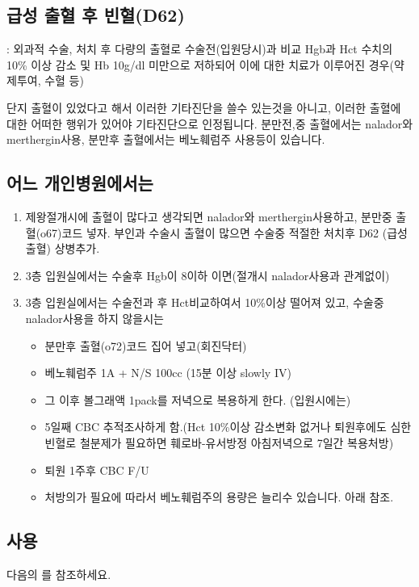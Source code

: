 \subsection*{급성 출혈 후 빈혈(D62)} : 외과적 수술, 처치 후 다량의 출혈로 수술전(입원당시)과 비교 Hgb과 Hct 수치의 10\% 이상 감소 및 Hb 10g/dl 미만으로 저하되어 이에 대한 치료가 이루어진 경우(약제투여, 수혈 등)

\begin{shaded}
단지 출혈이 있었다고 해서 이러한 기타진단을 쓸수 있는것을 아니고, 이러한 출혈에 대한 어떠한 행위가 있어야 기타진단으로 인정됩니다. 분만전,중 출혈에서는 nalador와 merthergin사용, 분만후 출혈에서는 베노훼럼주 사용등이 있습니다. 
\end{shaded}

\subsection*{어느 개인병원에서는}
\begin{enumerate}[가.]\tightlist
\item 제왕절개시에 출혈이 많다고 생각되면 nalador와 merthergin사용하고, 분만중 출혈(o67)코드 넣자. 부인과 수술시 출혈이 많으면 수술중 적절한 처치후 D62 (급성출혈) 상병추가.
\item 3층 입원실에서는 수술후 Hgb이 8이하 이면(절개시 nalador사용과 관계없이) 
\item 3층 입원실에서는 수술전과 후 Hct비교하여서 10\%이상 떨어져 있고, 수술중 nalador사용을 하지 않을시는 
	\begin{itemize}\tightlist
	\item 분만후 출혈(o72)코드 집어 넣고(회진닥터)
	\item 베노훼럼주 1A + N/S 100cc (15분 이상 slowly IV)
	\item 그 이후 볼그래액 1pack를 저녁으로 복용하게 한다. (입원시에는)
	\item 5일째 CBC 추적조사하게 함.(Hct 10\%이상 감소변화 없거나 퇴원후에도 심한 빈혈로 철분제가 필요하면 훼로바-유서방정 아침저녁으로 7일간 복용처방) 
	\item 퇴원 1주후 CBC F/U
	\item 처방의가 필요에 따라서 베노훼럼주의 용량은 늘리수 있습니다. 아래 참조.
	\end{itemize}
\end{enumerate}
\subsection*{ 사용} 
다음의 \pageref{VenoferrumInj}를 참조하세요.

